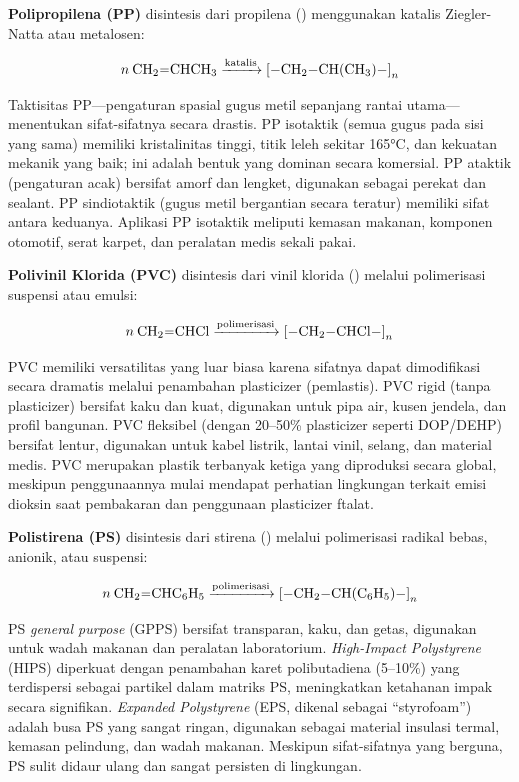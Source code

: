 \documentclass[12pt,a4paper,openany]{book}
\begin{document}
\textbf{Polipropilena (PP)} disintesis dari propilena () menggunakan katalis Ziegler-Natta atau metalosen:

\begin{equation}
n\:\ce{CH2=CHCH3} \xrightarrow{\text{katalis}} \ce{[-CH2-CH(CH3)-]}_n
\end{equation}

Taktisitas PP---pengaturan spasial gugus metil sepanjang rantai utama---menentukan sifat-sifatnya secara drastis. PP isotaktik (semua gugus  pada sisi yang sama) memiliki kristalinitas tinggi, titik leleh sekitar 165°C, dan kekuatan mekanik yang baik; ini adalah bentuk yang dominan secara komersial. PP ataktik (pengaturan acak) bersifat amorf dan lengket, digunakan sebagai perekat dan sealant. PP sindiotaktik (gugus metil bergantian secara teratur) memiliki sifat antara keduanya. Aplikasi PP isotaktik meliputi kemasan makanan, komponen otomotif, serat karpet, dan peralatan medis sekali pakai.

\textbf{Polivinil Klorida (PVC)} disintesis dari vinil klorida () melalui polimerisasi suspensi atau emulsi:

\begin{equation}
n\:\ce{CH2=CHCl} \xrightarrow{\text{polimerisasi}} \ce{[-CH2-CHCl-]}_n
\end{equation}

PVC memiliki versatilitas yang luar biasa karena sifatnya dapat dimodifikasi secara dramatis melalui penambahan plasticizer (pemlastis). PVC rigid (tanpa plasticizer) bersifat kaku dan kuat, digunakan untuk pipa air, kusen jendela, dan profil bangunan. PVC fleksibel (dengan 20--50\% plasticizer seperti DOP/DEHP) bersifat lentur, digunakan untuk kabel listrik, lantai vinil, selang, dan material medis. PVC merupakan plastik terbanyak ketiga yang diproduksi secara global, meskipun penggunaannya mulai mendapat perhatian lingkungan terkait emisi dioksin saat pembakaran dan penggunaan plasticizer ftalat.

\textbf{Polistirena (PS)} disintesis dari stirena () melalui polimerisasi radikal bebas, anionik, atau suspensi:

\begin{equation}
n\:\ce{CH2=CHC6H5} \xrightarrow{\text{polimerisasi}} \ce{[-CH2-CH(C6H5)-]}_n
\end{equation}

PS \textit{general purpose} (GPPS) bersifat transparan, kaku, dan getas, digunakan untuk wadah makanan dan peralatan laboratorium. \textit{High-Impact Polystyrene} (HIPS) diperkuat dengan penambahan karet polibutadiena (5--10\%) yang terdispersi sebagai partikel dalam matriks PS, meningkatkan ketahanan impak secara signifikan. \textit{Expanded Polystyrene} (EPS, dikenal sebagai ``styrofoam'') adalah busa PS yang sangat ringan, digunakan sebagai material insulasi termal, kemasan pelindung, dan wadah makanan. Meskipun sifat-sifatnya yang berguna, PS sulit didaur ulang dan sangat persisten di lingkungan.
\end{document}
